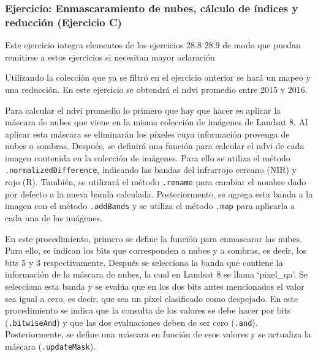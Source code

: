 \documentclass[
  12pt,
  letterpaper,
  twoside]{book}
\begin{document}
\hypertarget{ejercicio-enmascaramiento-de-nubes-cuxe1lculo-de-uxedndices-y-reducciuxf3n-ejercicio-c}{%
\subsubsection*{Ejercicio: Enmascaramiento de nubes, cálculo de índices y reducción (Ejercicio C)}\label{ejercicio-enmascaramiento-de-nubes-cuxe1lculo-de-uxedndices-y-reducciuxf3n-ejercicio-c}}

Este ejercicio integra elementos de los ejercicios 28.8 28.9 de modo que puedan remitirse a estos ejercicios si necesitan mayor aclaración

Utilizando la colección que ya se filtró en el ejercicio anterior se hará un mapeo y una reducción. En este ejercicio se obtendrá el ndvi promedio entre 2015 y 2016.

Para calcular el ndvi promedio lo primero que hay que hacer es aplicar la máscara de nubes que viene en la misma colección de imágenes de Landsat 8. Al aplicar esta máscara se eliminarán los píxeles cuya información provenga de nubes o sombras. Después, se definirá una función para calcular el ndvi de cada imagen contenida en la colección de imágenes. Para ello se utiliza el método \texttt{.normalizedDifference}, indicando las bandas del infrarrojo cercano (NIR) y rojo (R). También, se utilizará el método \texttt{.rename} para cambiar el nombre dado por defecto a la nueva banda calculada. Posteriormente, se agrega esta banda a la imagen con el método \texttt{.addBands} y se utiliza el método \texttt{.map} para aplicarla a cada una de las imágenes.

En este procedimiento, primero se define la función para enmascarar las nubes. Para ello, se indican los bits que corresponden a nubes y a sombras, es decir, los bits 5 y 3 respectivamente. Después se selecciona la banda que contiene la información de la máscara de nubes, la cual en Landsat 8 se llama `pixel\_qa'. Se selecciona esta banda y se evalúa que en los dos bits antes mencionados el valor sea igual a cero, es decir, que sea un píxel clasificado como despejado. En este procedimiento se indica que la consulta de los valores se debe hacer por bits (\texttt{.bitwiseAnd}) y que las dos evaluaciones deben de ser cero (\texttt{.and}). Posteriormente, se define una máscara en función de esos valores y se actualiza la máscara (\texttt{.updateMask}).
\end{document}

